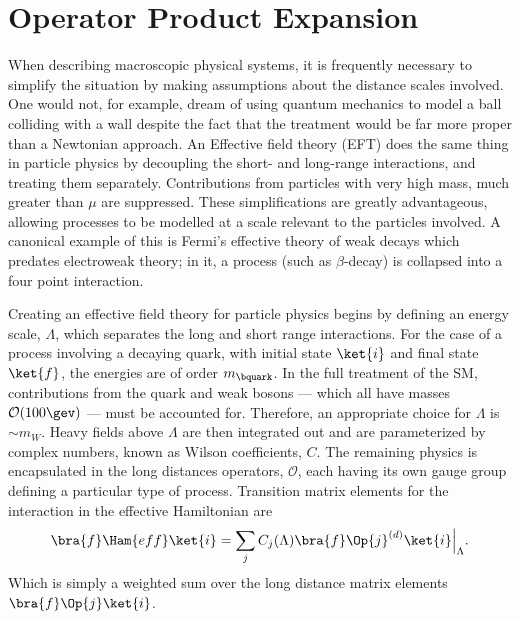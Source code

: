 \section{Operator Product Expansion}



When describing macroscopic physical systems, it is frequently necessary to simplify the situation by making
assumptions about the distance scales involved.
One would not, for example, dream of using quantum mechanics to model a ball colliding with a wall
despite the fact that the treatment would be far more proper than a Newtonian approach.
An Effective field theory (EFT) does the same thing in particle physics
by decoupling the short- and long-range interactions, and treating them separately.
Contributions from particles with very high mass, much greater than $\mu$ are suppressed.
These simplifications are greatly advantageous, allowing processes to be modelled at a scale
relevant to the particles involved.
A canonical example of this is Fermi's effective theory of weak decays which predates electroweak
theory; in it, a process (such as $\beta$-decay) is collapsed into a four point interaction.

Creating an effective field theory for particle physics begins by defining an energy scale,
$\Lambda$, which separates the long and short range interactions.
For the case of a process involving a decaying \bquark quark, with initial state $\ket{i}$ and
final state $\ket{f}$,
the energies are of order $m_\bquark$.
In the full treatment of the SM, contributions from the \tquark quark and weak bosons --- which all
have masses $\mathcal{O}(100\gev)$ --- must be accounted for.
Therefore, an appropriate choice for $\Lambda$ is $\sim m_W$.
Heavy fields above $\Lambda$ are then integrated out and are parameterized by complex numbers,
known as Wilson coefficients, $C$.
The remaining physics is encapsulated in the long distances operators, $\mathcal{O}$, each having
its own gauge group defining a particular type of process.
Transition matrix elements for the interaction in the effective Hamiltonian are
\begin{equation}
  \bra{f}\Ham{eff}\ket{i} =
  \sum_j C_j(\Lambda)\bra{f}\Op{j}^{(d)}\ket{i}\Big|_{\Lambda}.
\end{equation}
Which is simply a weighted sum over the long distance matrix elements $\bra{f}\Op{j}\ket{i}$.

